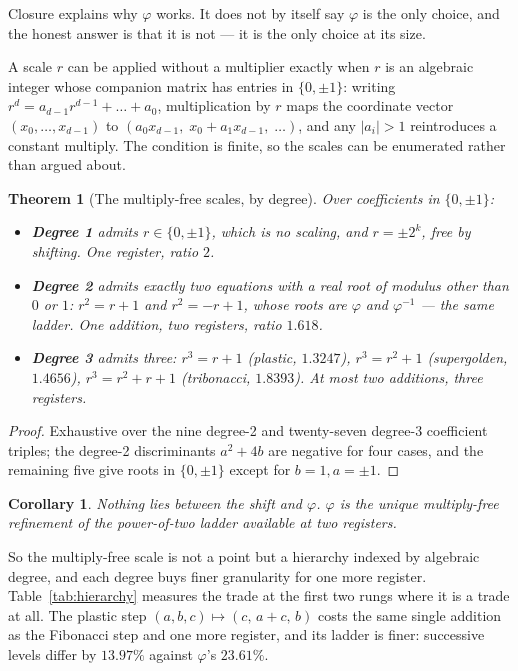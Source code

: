\documentclass[11pt]{article}
\newtheorem{theorem}{Theorem}
\newtheorem{corollary}{Corollary}
\theoremstyle{definition}
\begin{document}
Closure explains why $\varphi$ works. It does not by itself say $\varphi$ is the
only choice, and the honest answer is that it is not --- it is the only choice at
its size.

A scale $r$ can be applied without a multiplier exactly when $r$ is an algebraic
integer whose companion matrix has entries in $\{0,\pm1\}$: writing
$r^{d}=a_{d-1}r^{d-1}+\dots+a_0$, multiplication by $r$ maps the coordinate
vector $(x_0,\dots,x_{d-1})$ to $(a_0x_{d-1},\;x_0+a_1x_{d-1},\;\dots)$, and any
$|a_i|>1$ reintroduces a constant multiply. The condition is finite, so the
scales can be enumerated rather than argued about.

\begin{theorem}[The multiply-free scales, by degree]\label{thm:hierarchy}
Over coefficients in $\{0,\pm1\}$:
\begin{itemize}
\item \textbf{Degree 1} admits $r\in\{0,\pm1\}$, which is no scaling, and
      $r=\pm2^k$, free by shifting. One register, ratio $2$.
\item \textbf{Degree 2} admits exactly two equations with a real root of modulus
      other than $0$ or $1$: $r^2=r+1$ and $r^2=-r+1$, whose roots are $\varphi$
      and $\varphi^{-1}$ --- the same ladder. One addition, two registers,
      ratio $1.618$.
\item \textbf{Degree 3} admits three: $r^3=r+1$ (plastic, $1.3247$),
      $r^3=r^2+1$ (supergolden, $1.4656$), $r^3=r^2+r+1$ (tribonacci,
      $1.8393$). At most two additions, three registers.
\end{itemize}
\end{theorem}
\begin{proof}
Exhaustive over the nine degree-2 and twenty-seven degree-3 coefficient triples;
the degree-2 discriminants $a^2+4b$ are negative for four cases, and the
remaining five give roots in $\{0,\pm1\}$ except for $b=1,a=\pm1$.
\end{proof}

\begin{corollary}\label{cor:nothing-between}
Nothing lies between the shift and $\varphi$. $\varphi$ is the unique
multiply-free refinement of the power-of-two ladder available at two registers.
\end{corollary}

So the multiply-free scale is not a point but a hierarchy indexed by algebraic
degree, and each degree buys finer granularity for one more register.
Table~\ref{tab:hierarchy} measures the trade at the first two rungs where it is
a trade at all. The plastic step
$(a,b,c)\mapsto(c,\,a+c,\,b)$ costs the same single addition as the Fibonacci
step and one more register, and its ladder is finer: successive levels differ by
$13.97\%$ against $\varphi$'s $23.61\%$.
\end{document}
